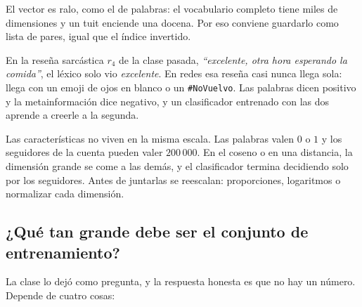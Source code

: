 \documentclass[11pt,letterpaper]{article}
\begin{document}
El vector es ralo, como el de palabras: el vocabulario completo tiene
miles de dimensiones y un tuit enciende una docena. Por eso conviene
guardarlo como lista de pares, igual que el índice invertido.

\begin{idea}
    En la reseña sarcástica $r_4$ de la clase pasada,
    \textit{``excelente, otra hora esperando la comida''}, el léxico
    solo vio \textit{excelente}. En redes esa reseña casi nunca llega
    sola: llega con un emoji de ojos en blanco o un
    \texttt{\#NoVuelvo}. Las palabras dicen positivo y la
    metainformación dice negativo, y un clasificador entrenado con las
    dos aprende a creerle a la segunda.
\end{idea}

\begin{ojo}
    Las características no viven en la misma escala. Las palabras
    valen $0$ o $1$ y los seguidores de la cuenta pueden valer
    $200\,000$. En el coseno o en una distancia, la dimensión grande
    se come a las demás, y el clasificador termina decidiendo solo por
    los seguidores. Antes de juntarlas se reescalan: proporciones,
    logaritmos o normalizar cada dimensión.
\end{ojo}


\subsection*{¿Qué tan grande debe ser el conjunto de entrenamiento?}

La clase lo dejó como pregunta, y la respuesta honesta es que no hay
un número. Depende de cuatro cosas:
\end{document}
